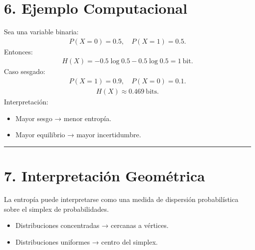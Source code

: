 \documentclass[letterpaper,10pt,english]{jupyterBook}
\begin{document}
\section{6. Ejemplo Computacional}
\label{\detokenize{01_theory/entropy:ejemplo-computacional}}
\sphinxAtStartPar
Sea una variable binaria:
\begin{equation*}
\begin{split}
P(X=0)=0.5,\quad P(X=1)=0.5.
\end{split}
\end{equation*}
\sphinxAtStartPar
Entonces:
\begin{equation*}
\begin{split}
H(X)= -0.5\log 0.5 -0.5\log 0.5 = 1\ \text{bit}.
\end{split}
\end{equation*}
\sphinxAtStartPar
Caso sesgado:
\begin{equation*}
\begin{split}
P(X=1)=0.9,\quad P(X=0)=0.1.
\end{split}
\end{equation*}\begin{equation*}
\begin{split}
H(X) \approx 0.469\ \text{bits}.
\end{split}
\end{equation*}
\sphinxAtStartPar
Interpretación:
\begin{itemize}
\item {} 
\sphinxAtStartPar
Mayor sesgo → menor entropía.

\item {} 
\sphinxAtStartPar
Mayor equilibrio → mayor incertidumbre.

\end{itemize}


\bigskip\hrule\bigskip



\section{7. Interpretación Geométrica}
\label{\detokenize{01_theory/entropy:interpretacion-geometrica}}
\sphinxAtStartPar
La entropía puede interpretarse como una medida de dispersión probabilística sobre el simplex de probabilidades.
\begin{itemize}
\item {} 
\sphinxAtStartPar
Distribuciones concentradas → cercanas a vértices.

\item {} 
\sphinxAtStartPar
Distribuciones uniformes → centro del simplex.

\end{itemize}
\end{document}
